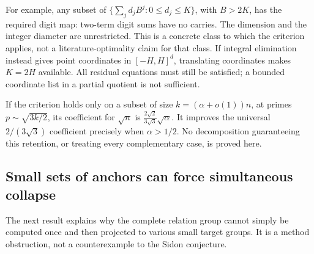 \documentclass[11pt]{article}
\theoremstyle{definition}
\theoremstyle{remark}
\begin{document}
For example, any subset of
$\{\sum_jd_jB^j:0\le d_j\le K\}$, with $B>2K$, has the required digit
map: two-term digit sums have no carries. The dimension and the integer
diameter are unrestricted. This is a concrete class to which the
criterion applies, not a literature-optimality claim for that class.
If integral elimination instead gives point coordinates in
$[-H,H]^d$, translating coordinates makes $K=2H$ available. All
residual equations must still be satisfied; a bounded coordinate list
in a partial quotient is not sufficient.

If the criterion holds only on a subset of size
$k=(\alpha+o(1))n$, at primes $p\sim\sqrt{3k/2}$, its coefficient for
$\sqrt n$ is
$\frac{2\sqrt2}{3\sqrt3}\sqrt\alpha$. It improves the universal
$2/(3\sqrt3)$ coefficient precisely when $\alpha>1/2$.
No decomposition guaranteeing this retention, or treating every
complementary case, is proved here.

\subsection{Small sets of anchors can force simultaneous collapse}

The next result explains why the complete relation group cannot simply
be computed once and then projected to various small target groups.
It is a method obstruction, not a counterexample to the Sidon conjecture.
\end{document}
